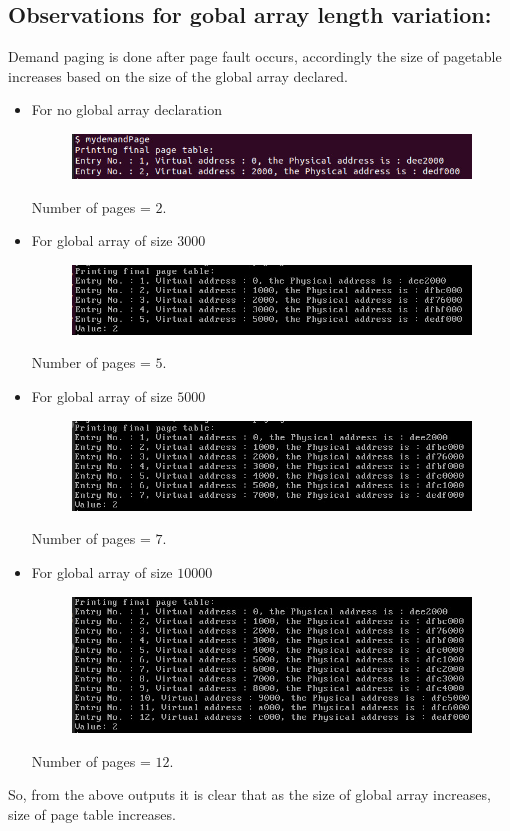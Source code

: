 \documentclass[12pt,a4paper]{article}
\begin{document}
	\subsection*{Observations for gobal array length variation:}
Demand paging is done after page fault occurs, accordingly the size of pagetable increases based on the size of the global array declared.
\begin{itemize}
	\item For no global array declaration 			
	\begin{figure}[H]
		\centering
		\includegraphics[width=1\textwidth]{1}
	\end{figure}
Number of pages = $2$.
\item For global array of size $3000$
	\begin{figure}[H]
	\centering
	\includegraphics[width=1\textwidth]{2}
\end{figure}
Number of pages = $5$.
\item For global array of size $5000$
\begin{figure}[H]
	\centering
	\includegraphics[width=1\textwidth]{3}
\end{figure}
Number of pages = $7$.
\item For global array of size $10000$
\begin{figure}[H]
	\centering
	\includegraphics[width=1\textwidth]{4}
\end{figure}
Number of pages = $12$.
\end{itemize}
So, from the above outputs it is clear that as the size of global array increases, size of page table increases.
\end{document}
